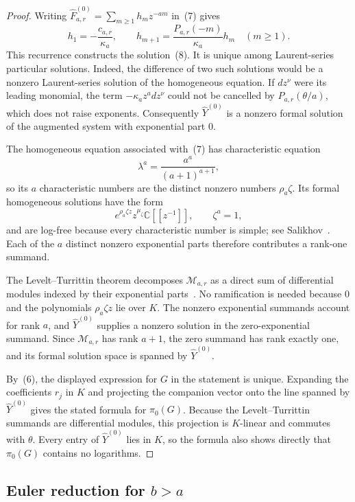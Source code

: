 \documentclass[12pt]{article}
\begin{document}
\begin{proof}
Writing $\widehat F_{a,r}^{(0)}=\sum_{m\geq1}h_mz^{-am}$ in~(7) gives
\[
h_1=-\frac{c_{a,r}}{\kappa_a},
\qquad
h_{m+1}=\frac{P_{a,r}(-m)}{\kappa_a}h_m
\quad(m\geq1).
\tag{9}
\]
This recurrence constructs the solution~(8). It is unique among Laurent-series particular solutions. Indeed, the difference of two such solutions would be a nonzero Laurent-series solution of the homogeneous equation. If $dz^\nu$ were its leading monomial, the term $-\kappa_a z^a dz^\nu$ could not be cancelled by $P_{a,r}(\theta/a)$, which does not raise exponents. Consequently $\widehat Y^{(0)}$ is a nonzero formal solution of the augmented system with exponential part $0$.

The homogeneous equation associated with~(7) has characteristic equation
\[
\lambda^a=\frac{a^a}{(a+1)^{a+1}},
\]
so its $a$ characteristic numbers are the distinct nonzero numbers $\rho_a\zeta$. Its formal homogeneous solutions have the form
\[
e^{\rho_a\zeta z}z^{\mu_\zeta}\mathbb C[[z^{-1}]],
\qquad \zeta^a=1,
\]
and are log-free because every characteristic number is simple; see Salikhov~\cite[Remark~2, p.~206]{salikhov}. Each of the $a$ distinct nonzero exponential parts therefore contributes a rank-one summand.

The Levelt--Turrittin theorem decomposes $\mathcal M_{a,r}$ as a direct sum of differential modules indexed by their exponential parts~\cite[Chapter~3, Theorem~3.1]{vdput-singer}. No ramification is needed because $0$ and the polynomials $\rho_a\zeta z$ lie over $K$. The nonzero exponential summands account for rank $a$, and $\widehat Y^{(0)}$ supplies a nonzero solution in the zero-exponential summand. Since $\mathcal M_{a,r}$ has rank $a+1$, the zero summand has rank exactly one, and its formal solution space is spanned by $\widehat Y^{(0)}$.

By~(6), the displayed expression for $G$ in the statement is unique. Expanding the coefficients $r_j$ in $K$ and projecting the companion vector onto the line spanned by $\widehat Y^{(0)}$ gives the stated formula for $\pi_0(G)$. Because the Levelt--Turrittin summands are differential modules, this projection is $K$-linear and commutes with $\theta$. Every entry of $\widehat Y^{(0)}$ lies in $K$, so the formula also shows directly that $\pi_0(G)$ contains no logarithms.
\end{proof}

\subsection{Euler reduction for \texorpdfstring{$b>a$}{b > a}}
\label{sec:euler-reduction}
\end{document}
